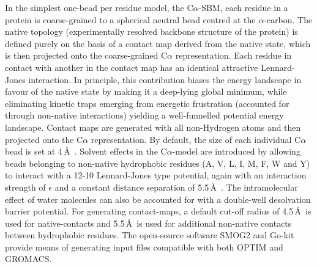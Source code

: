 \documentclass[journal=jacsat]{achemso}
\begin{document}
In the simplest one-bead per residue model, the C$\alpha$-SBM, each residue in a protein is coarse-grained to a spherical neutral bead centred at the $\alpha$-carbon. The native topology (experimentally resolved backbone structure of the protein) is defined purely on the basis of a contact map derived from the native state, which is then projected onto the coarse-grained C$\alpha$ representation. Each residue in contact with another in the contact map has an identical attractive Lennard-Jones interaction. In principle, this contribution biases the energy landscape in favour of the native state by making it a deep-lying global minimum, while eliminating kinetic traps emerging from energetic frustration (accounted for through non-native interactions) yielding a well-funnelled potential energy landscape. Contact maps are generated with all non-Hydrogen atoms and then projected onto the C$\alpha$ representation. By default, the size of each individual C$\alpha$ bead is set at 4\,\AA~. Solvent effects in the C$\alpha$-model are introduced by allowing beads belonging to non-native hydrophobic residues (A, V, L, I, M, F, W and Y) to interact with a 12-10 Lennard-Jones type potential, again with an interaction strength of $\epsilon$ and a constant distance separation of 5.5\,\AA\ \cite{Sutto07a}. The intramolecular effect of water molecules can also be accounted for with a double-well desolvation barrier potential\cite{Liu05a,Rank09a}. For generating contact-maps, a default cut-off radius of 4.5\,\AA\ is used for native-contacts and 5.5\,\AA\ is used for additional non-native contacts between hydrophobic residues. The open-source software SMOG2 \cite{smog} and Go-kit\cite{Neelamraju18a} provide means of generating input files compatible with both OPTIM\cite{OPTIM} and GROMACS\cite{GROMACS1,GROMACS2}.
\end{document}
